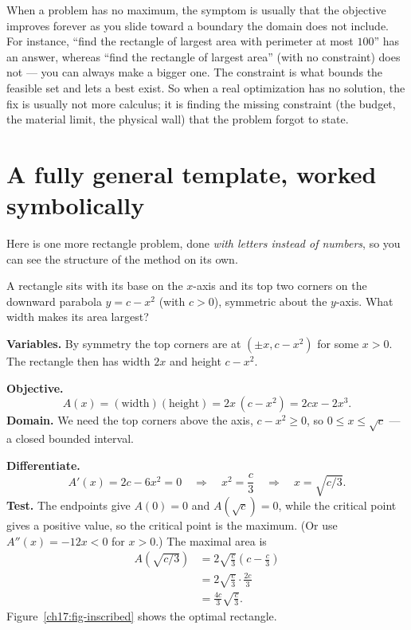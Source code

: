 \begin{happeningbox}
When a problem has no maximum, the symptom is usually that the objective improves
forever as you slide toward a boundary the domain does not include. For instance, ``find the
rectangle of largest area with perimeter at most $100$'' has an answer, whereas ``find the
rectangle of largest area'' (with no constraint) does not --- you can always make a bigger
one. The constraint is what bounds the feasible set and lets a best exist. So when a
real optimization has no solution, the fix is usually not more calculus; it is
finding the missing constraint (the budget, the material limit, the physical wall)
that the problem forgot to state.
\end{happeningbox}

\section{A fully general template, worked symbolically}

Here is one more rectangle problem, done \emph{with letters instead of numbers}, so
you can see the structure of the method on its own.

\begin{example}\label{ch17:ex-inscribed}
A rectangle sits with its base on the $x$-axis and its top two corners on the
downward parabola $y = c - x^2$ (with $c>0$), symmetric about the $y$-axis. What width
makes its area largest?
\end{example}

\textbf{Variables.} By symmetry the top corners are at $(\pm x, c - x^2)$ for some
$x>0$. The rectangle then has width $2x$ and height $c - x^2$.

\textbf{Objective.}
\[
A(x) = (\text{width})(\text{height}) = 2x\,(c - x^2) = 2cx - 2x^3.
\]
\textbf{Domain.} We need the top corners above the axis, $c - x^2 \ge 0$, so
$0 \le x \le \sqrt{c}$ --- a closed bounded interval.

\textbf{Differentiate.}
\[
A'(x) = 2c - 6x^2 = 0 \quad\Longrightarrow\quad x^2 = \frac{c}{3}
\quad\Longrightarrow\quad x = \sqrt{c/3}.
\]
\textbf{Test.} The endpoints give $A(0)=0$ and $A(\sqrt c)=0$, while the critical
point gives a positive value, so the critical point is the maximum. (Or use
$A''(x)=-12x<0$ for $x>0$.) The maximal area is
\begin{align*}
A\!\left(\sqrt{c/3}\right) &= 2\sqrt{\tfrac{c}{3}}\left(c - \tfrac{c}{3}\right)\\
&= 2\sqrt{\tfrac{c}{3}}\cdot \tfrac{2c}{3}\\
&= \frac{4c}{3}\sqrt{\frac{c}{3}}.
\end{align*}
Figure~\ref{ch17:fig-inscribed} shows the optimal rectangle.

